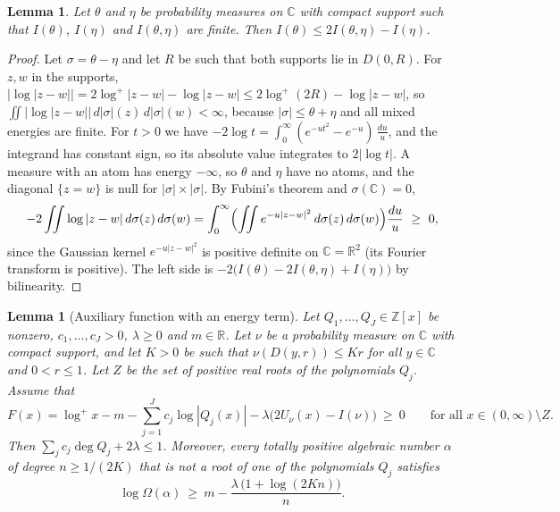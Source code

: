 \documentclass[11pt]{amsart}
\newtheorem{lemma}[theorem]{Lemma}
\theoremstyle{remark}
\numberwithin{equation}{section}
\newcommand{\R}{\mathbb{R}}
\newcommand{\Z}{\mathbb{Z}}
\newcommand{\C}{\mathbb{C}}
\newcommand{\logp}{\log^{+}}
\begin{document}
\begin{lemma}\label{lem:neg}
Let $\theta$ and $\eta$ be probability measures on $\C$ with compact support such that $I(\theta)$, $I(\eta)$ and $I(\theta,\eta)$ are finite. Then $I(\theta)\le2I(\theta,\eta)-I(\eta)$.
\end{lemma}

\begin{proof}
Let $\sigma=\theta-\eta$ and let $R$ be such that both supports lie in $D(0,R)$. For $z,w$ in the supports, $|\log|z-w||=2\logp|z-w|-\log|z-w|\le2\log^+(2R)-\log|z-w|$, so $\iint|\log|z-w||\,d|\sigma|(z)\,d|\sigma|(w)<\infty$, because $|\sigma|\le\theta+\eta$ and all mixed energies are finite. For $t>0$ we have $-2\log t=\int_0^\infty(e^{-ut^2}-e^{-u})\,\frac{du}u$, and the integrand has constant sign, so its absolute value integrates to $2|\log t|$. A measure with an atom has energy $-\infty$, so $\theta$ and $\eta$ have no atoms, and the diagonal $\{z=w\}$ is null for $|\sigma|\times|\sigma|$. By Fubini's theorem and $\sigma(\C)=0$,
\[
-2\iint\log|z-w|\,d\sigma(z)\,d\sigma(w)=\int_0^\infty\Bigl(\iint e^{-u|z-w|^2}\,d\sigma(z)\,d\sigma(w)\Bigr)\frac{du}u\ \ge\ 0,
\]
since the Gaussian kernel $e^{-u|z-w|^2}$ is positive definite on $\C=\R^2$ (its Fourier transform is positive). The left side is $-2\bigl(I(\theta)-2I(\theta,\eta)+I(\eta)\bigr)$ by bilinearity.
\end{proof}

\begin{lemma}[Auxiliary function with an energy term]\label{lem:aux}
Let $Q_1,\dots,Q_J\in\Z[x]$ be nonzero, $c_1,\dots,c_J>0$, $\lambda\ge0$ and $m\in\R$. Let $\nu$ be a probability measure on $\C$ with compact support, and let $K>0$ be such that $\nu(D(y,r))\le Kr$ for all $y\in\C$ and $0<r\le1$. Let $Z$ be the set of positive real roots of the polynomials $Q_j$. Assume that
\begin{equation}\label{eq:F}
F(x)=\logp x-m-\sum_{j=1}^Jc_j\log|Q_j(x)|-\lambda\bigl(2U_\nu(x)-I(\nu)\bigr)\ \ge\ 0\qquad\text{for all }x\in(0,\infty)\setminus Z.
\end{equation}
Then $\sum_jc_j\deg Q_j+2\lambda\le1$. Moreover, every totally positive algebraic number $\alpha$ of degree $n\ge1/(2K)$ that is not a root of one of the polynomials $Q_j$ satisfies
\begin{equation}\label{eq:eff}
\log\Omega(\alpha)\ \ge\ m-\frac{\lambda\,\bigl(1+\log(2Kn)\bigr)}{n}.
\end{equation}
\end{lemma}
\end{document}

